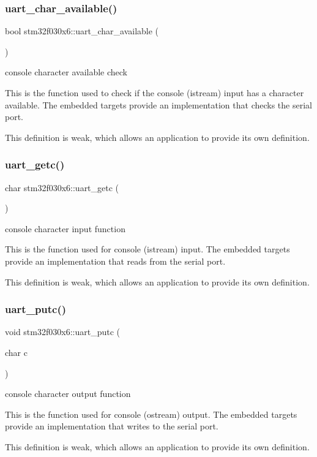 \subsubsection{\texorpdfstring{uart\+\_\+char\+\_\+available()}{uart\_char\_available()}}
{\footnotesize\ttfamily bool stm32f030x6\+::uart\+\_\+char\+\_\+available (\begin{DoxyParamCaption}{ }\end{DoxyParamCaption})}

console character available check

This is the function used to check if the console (istream) input has a character available. The embedded targets provide an implementation that checks the serial port.

This definition is weak, which allows an application to provide its own definition. \mbox{\label{namespacestm32f030x6_ae4ffd99ebca764be1c506dbebb59eb07}} 
\subsubsection{\texorpdfstring{uart\+\_\+getc()}{uart\_getc()}}
{\footnotesize\ttfamily char stm32f030x6\+::uart\+\_\+getc (\begin{DoxyParamCaption}{ }\end{DoxyParamCaption})}

console character input function

This is the function used for console (istream) input. The embedded targets provide an implementation that reads from the serial port.

This definition is weak, which allows an application to provide its own definition. \mbox{\label{namespacestm32f030x6_ac4348e3318c69d76563ecfde8655d833}} 
\subsubsection{\texorpdfstring{uart\+\_\+putc()}{uart\_putc()}}
{\footnotesize\ttfamily void stm32f030x6\+::uart\+\_\+putc (\begin{DoxyParamCaption}\item[{char}]{c }\end{DoxyParamCaption})}

console character output function

This is the function used for console (ostream) output. The embedded targets provide an implementation that writes to the serial port.

This definition is weak, which allows an application to provide its own definition. 